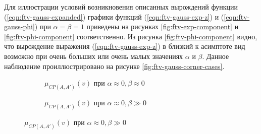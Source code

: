 Для иллюстрации условий возникновения описанных вырождений функции (\ref{eqn:ftv-gauss-expanded}) графики функций (\ref{eqn:ftv-gauss-exp-z}) и (\ref{eqn:ftv-gauss-phi}) при $\alpha = \beta = 1$ приведены на рисунках \cref{fig:ftv-exp-component} и \cref{fig:ftv-phi-component} соответственно. Из рисунка \cref{fig:ftv-phi-component} видно, что вырождение выражения (\ref{eqn:ftv-gauss-exp-z}) в близкий к асимптоте вид возможно при очень больших или очень малых значениях $\alpha$ и $\beta$. Данное наблюдение проиллюстрировано на рисунке \cref{fig:ftv-gauss-corner-cases}.

\begin{figure}[htbp]
	\centering
	
	\begin{subfigure}[t]{0.48\textwidth}
		\newcommand{\aOne}{1}
		\newcommand{\bOne}{0.2}
		\newcommand{\aTwo}{0.95}
		\newcommand{\bTwo}{1}
		\centering
		\caption{$\mu_{CP(A, A')}(v)$ при $\alpha \approx 0, \beta \approx 0$}
		\label{fig:ftv-corner-cases-zeroBeta-1}
	\end{subfigure}
	\hfill
	\begin{subfigure}[t]{0.48\textwidth}
		\newcommand{\aOne}{1}
		\newcommand{\bOne}{1}
		\newcommand{\aTwo}{0.95}
		\newcommand{\bTwo}{0.1}
		\centering
		\caption{$\mu_{CP(A, A')}(v)$ при $\alpha \approx 0, \beta \gg 0$}
		\label{fig:ftv-corner-cases-largeBeta-1}
	\end{subfigure}
	

\end{figure}
